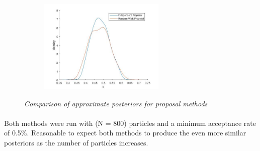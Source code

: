 \documentclass[12,fleqn]{article}
\theoremstyle{definition}
\theoremstyle{plain}
\begin{document}
\begin{figure}[H]
\begin{subfigure}{6cm}
\end{subfigure}
\begin{subfigure}{6cm}
\centering
\includegraphics[width=6cm]{gandk_comparison_k.jpg}
\end{subfigure}
\caption{\textit{Comparison of approximate posteriors for proposal methods}}
\end{figure}

\paragraph{}
Both methods were run with (N = 800) particles and a minimum acceptance rate of 0.5\%. Reasonable to expect both methods to produce the even more similar posteriors as the number of particles increases. 
\par
\end{document}
